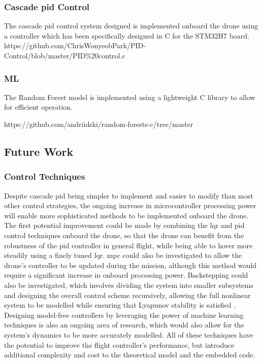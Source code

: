 \subsubsection{Cascade \gls{pid} Control}

The cascade \gls{pid} control system designed is implemented onboard the drone using a controller which has been specifically designed in C for the STM32H7 board. https://github.com/ChrisWonyeobPark/PID-Control/blob/master/PID\%20control.c


\subsubsection{ML}

The Random Forest model is implemented using a lightweight C library to allow for efficient operation. 

https://github.com/andriidski/random-forests-c/tree/master

\newpage

\subsection{Future Work}

\subsubsection{Control Techniques}

Despite cascade \gls{pid} being simpler to implement and easier to modify than most other control strategies, the ongoing increase in microcontroller processing power will enable more sophisticated methods to be implemented onboard the drone. The first potential improvement could be made by combining the \gls{lqr} and \gls{pid} control techniques onboard the drone, so that the drone can benefit from the robustness of the \gls{pid} controller in general flight, while being able to hover more steadily using a finely tuned \gls{lqr}. \gls{mpc} could also be investigated to allow the drone's controller to be updated during the mission, although this method would require a significant increase in onboard processing power. Backstepping could also be investigated, which involves dividing the system into smaller subsystems and designing the overall control scheme recursively, allowing the full nonlinear system to be modelled while ensuring that Lyapunov stability is satisfied \cite{4058900}. Designing model-free controllers by leveraging the power of machine learning techniques is also an ongoing area of research, which would also allow for the system's dynamics to be more accurately modelled. All of these techniques have the potential to improve the flight controller's performance, but introduce additional complexity and cost to the theoretical model and the embedded code.

